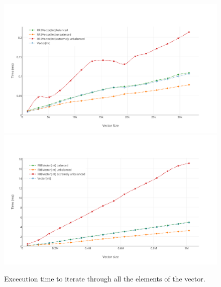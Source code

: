 \begin{figure}[h!]
  \centering
  \includegraphics[width=\textwidth]{Benchmarks/Iteration_3.pdf}
  \includegraphics[width=\textwidth]{Benchmarks/Iteration_4.pdf}
  \label{IterationBenchmarks}
  \caption{Excecution time to iterate through all the elements of the vector.}
\end{figure}

